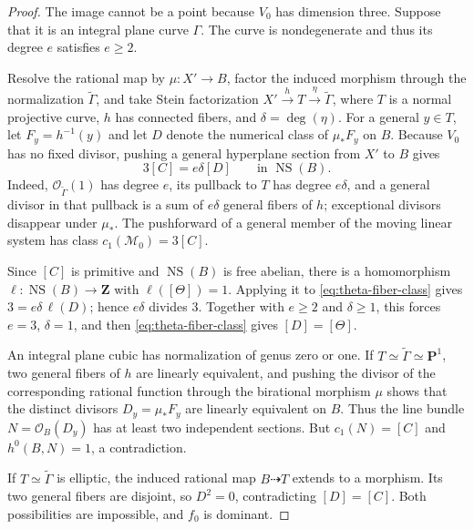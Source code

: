 \documentclass[12pt]{amsart}
\numberwithin{equation}{section}
\theoremstyle{definition}
\theoremstyle{remark}
\newcommand{\Z}{\mathbf Z}
\newcommand{\PP}{\mathbf P}
\begin{document}
\begin{proof}
The image cannot be a point because $V_0$ has dimension three.  Suppose
that it is an integral plane curve $\Gamma$.  The curve is nondegenerate and thus its degree
$e$ satisfies $e\geq2$.

Resolve the rational map by $\mu:X'\to B$, factor the induced morphism
through the normalization $\widetilde\Gamma$, and take Stein
factorization
$X'\xrightarrow{h}T\xrightarrow{\eta}\widetilde\Gamma$, where $T$ is a
normal projective curve, $h$ has connected fibers, and
$\delta=\deg(\eta)$.  For a general $y\in T$, let $F_y=h^{-1}(y)$ and
let $D$ denote the numerical class of $\mu_*F_y$ on $B$.  Because
$V_0$ has no fixed divisor, pushing a general hyperplane section from
$X'$ to $B$ gives
\begin{equation}
 3[C]=e\delta[D]\qquad\text{in }\operatorname{NS}(B).
\label{eq:theta-fiber-class}
\end{equation}
Indeed, $\mathcal O_{\widetilde\Gamma}(1)$ has degree $e$, its pullback
to $T$ has degree $e\delta$, and a general divisor in that pullback is a
sum of $e\delta$ general fibers of $h$; exceptional divisors disappear
under $\mu_*$.  The pushforward of a general member of the moving linear
system has class $c_1(\mathscr M_0)=3[C]$.

Since $[C]$ is primitive and
$\operatorname{NS}(B)$ is free abelian, there is a homomorphism
$\ell:\operatorname{NS}(B)\to\Z$ with
$\ell([\Theta])=1$.  Applying it to
\eqref{eq:theta-fiber-class} gives
$3=e\delta\,\ell(D)$; hence $e\delta$ divides $3$.  Together with
$e\geq2$ and $\delta\geq1$, this forces
$e=3$, $\delta=1$, and then
\eqref{eq:theta-fiber-class} gives $[D]=[\Theta]$.

An integral plane cubic has normalization of genus zero or one.  If
$T\simeq\widetilde\Gamma\simeq\PP^1$, two general fibers of $h$ are
linearly equivalent, and pushing the divisor of the corresponding
rational function through the birational morphism $\mu$ shows that the
distinct divisors $D_y=\mu_*F_y$ are linearly equivalent on $B$.  Thus
the line bundle $N=\mathcal O_B(D_y)$ has at least two independent
sections.  But
$c_1(N)=[C]$ and $h^0(B,N)=1$, a contradiction.

If $T\simeq\widetilde\Gamma$ is elliptic, the induced rational map
$B\dashrightarrow T$ extends to a morphism.  Its two
general fibers are disjoint, so $D^2=0$, contradicting
$[D]=[C]$.  Both possibilities are impossible,
and $f_0$ is dominant.
\end{proof}
\end{document}
